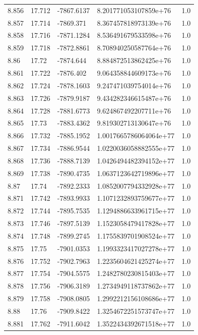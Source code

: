 \begin{tabular}{lllll}
8.856 & 17.712 & -7867.6137 & 8.201771053107859e+76 & 1.0 \\
8.857 & 17.714 & -7869.371 & 8.367457818973139e+76 & 1.0 \\
8.858 & 17.716 & -7871.1284 & 8.536491679533598e+76 & 1.0 \\
8.859 & 17.718 & -7872.8861 & 8.708940250587764e+76 & 1.0 \\
8.86 & 17.72 & -7874.644 & 8.884872513862425e+76 & 1.0 \\
8.861 & 17.722 & -7876.402 & 9.064358844609173e+76 & 1.0 \\
8.862 & 17.724 & -7878.1603 & 9.247471039754014e+76 & 1.0 \\
8.863 & 17.726 & -7879.9187 & 9.434282346615487e+76 & 1.0 \\
8.864 & 17.728 & -7881.6773 & 9.624867492207711e+76 & 1.0 \\
8.865 & 17.73 & -7883.4362 & 9.819302713130647e+76 & 1.0 \\
8.866 & 17.732 & -7885.1952 & 1.0017665786064064e+77 & 1.0 \\
8.867 & 17.734 & -7886.9544 & 1.0220036058882555e+77 & 1.0 \\
8.868 & 17.736 & -7888.7139 & 1.0426494482394152e+77 & 1.0 \\
8.869 & 17.738 & -7890.4735 & 1.0637123642719896e+77 & 1.0 \\
8.87 & 17.74 & -7892.2333 & 1.0852007794332928e+77 & 1.0 \\
8.871 & 17.742 & -7893.9933 & 1.1071232893759677e+77 & 1.0 \\
8.872 & 17.744 & -7895.7535 & 1.1294886633961715e+77 & 1.0 \\
8.873 & 17.746 & -7897.5139 & 1.1523058479417828e+77 & 1.0 \\
8.874 & 17.748 & -7899.2745 & 1.1755839701908524e+77 & 1.0 \\
8.875 & 17.75 & -7901.0353 & 1.1993323417027278e+77 & 1.0 \\
8.876 & 17.752 & -7902.7963 & 1.2235604621425274e+77 & 1.0 \\
8.877 & 17.754 & -7904.5575 & 1.2482780230815403e+77 & 1.0 \\
8.878 & 17.756 & -7906.3189 & 1.2734949118737862e+77 & 1.0 \\
8.879 & 17.758 & -7908.0805 & 1.2992212156108686e+77 & 1.0 \\
8.88 & 17.76 & -7909.8422 & 1.3254672251573747e+77 & 1.0 \\
8.881 & 17.762 & -7911.6042 & 1.3522434392671518e+77 & 1.0 \\

\end{tabular}
